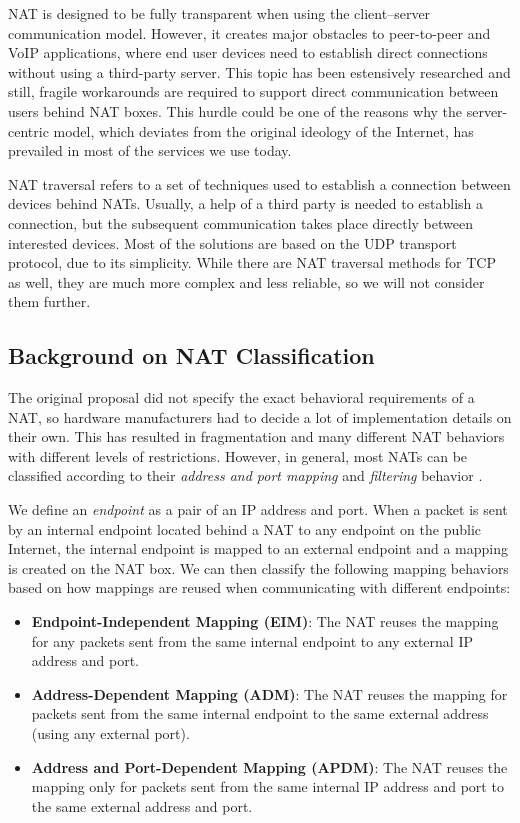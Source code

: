 NAT is designed to be fully transparent when using the client–server communication model. However, it creates major obstacles to peer-to-peer and VoIP applications, where end user devices need to establish direct connections without using a third-party server. This topic has been estensively researched and still, fragile workarounds are required to support direct communication between users behind NAT boxes. This hurdle could be one of the reasons why the server-centric model, which deviates from the original ideology of the Internet, has prevailed in most of the services we use today.

NAT traversal refers to a set of techniques used to establish a connection between devices behind NATs. Usually, a help of a third party is needed to establish a connection, but the subsequent communication takes place directly between interested devices.
Most of the solutions are based on the UDP transport protocol, due to its simplicity. While there are NAT traversal methods for TCP as well, they are much more complex and less reliable, so we will not consider them further.

\subsection{Background on NAT Classification}
\label{nat-classification}


The original proposal did not specify the exact behavioral requirements of a NAT, so hardware manufacturers had to decide a lot of implementation details on their own. This has resulted in fragmentation and many different NAT behaviors with different levels of restrictions. However, in general, most NATs can be classified according to their \textit{address and port mapping} and \textit{filtering} behavior \cite{behave}.

We define an \textit{endpoint} as a pair of an IP address and port. When a packet is sent by an internal endpoint located behind a NAT to any endpoint on the public Internet, the internal endpoint is mapped to an external endpoint and a mapping is created on the NAT box. We can then classify the following mapping behaviors based on how mappings are reused when communicating with different endpoints:

\begin{itemize}
    \item \textbf{Endpoint-Independent Mapping (EIM)}: The NAT reuses the mapping for any packets sent from the same internal endpoint to any external IP address and port.
    \item \textbf{Address-Dependent Mapping (ADM)}: The NAT reuses the mapping for packets sent from the same internal endpoint to the same external address (using any external port).
    \item \textbf{Address and Port-Dependent Mapping (APDM)}: The NAT reuses the mapping only for packets sent from the same internal IP address and port to the same external address and port.
\end{itemize}


